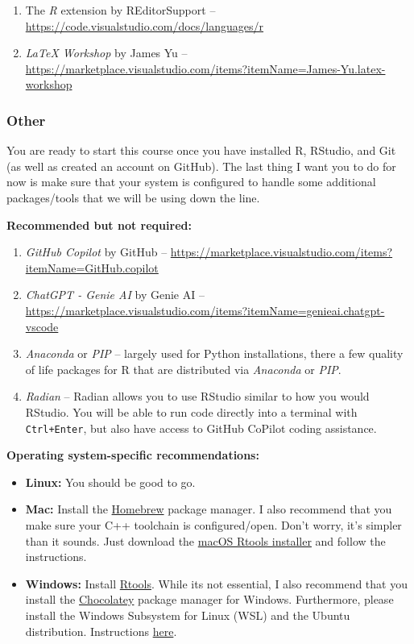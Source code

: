 \documentclass[11pt]{article}
\begin{document}
\begin{enumerate}
  \item The \textit{R} extension by REditorSupport -- \url{https://code.visualstudio.com/docs/languages/r}
  \item \textit{LaTeX Workshop} by James Yu -- \url{https://marketplace.visualstudio.com/items?itemName=James-Yu.latex-workshop}
\end{enumerate}

\vspace{-0.25cm}
\subsubsection*{Other}

You are ready to start this course once you have installed R, RStudio, and Git (as well as created an account on GitHub). The last thing I want you to do for now is make sure that your system is configured to handle some additional packages/tools that we will be using down the line. 

\textbf{Recommended but not required:}
\begin{enumerate}
  \item \textit{GitHub Copilot} by GitHub -- \url{https://marketplace.visualstudio.com/items?itemName=GitHub.copilot}
  \item \textit{ChatGPT - Genie AI} by Genie AI -- \url{https://marketplace.visualstudio.com/items?itemName=genieai.chatgpt-vscode}
  \item \textit{Anaconda} or \textit{PIP} -- largely used for Python installations, there a few quality of life packages for R that are distributed via \textit{Anaconda} or \textit{PIP}.
  \item \textit{Radian} -- Radian allows you to use RStudio similar to how you would RStudio. You will be able to run code directly into a terminal with \texttt{Ctrl+Enter}, but also have access to GitHub CoPilot coding assistance. 
\end{enumerate}

\textbf{Operating system-specific recommendations:}

\begin{itemize}
	\item \textbf{Linux:} You should be good to go. 
	\item \textbf{Mac:} Install the \href{https://brew.sh/}{Homebrew} package manager. I also recommend that you make sure your C++ toolchain is configured/open. Don't worry, it's simpler than it sounds. Just download the \href{https://github.com/rmacoslib/r-macos-rtools#installer-package-for-macos-r-toolchain-}{macOS Rtools installer} and follow the instructions.
	\item \textbf{Windows:} Install \href{https://cran.r-project.org/bin/windows/Rtools/}{Rtools}. While its not essential, I also recommend that you install the \href{https://chocolatey.org/}{Chocolatey} package manager for Windows. Furthermore, please install the Windows Subsystem for Linux (WSL) and the Ubuntu distribution. Instructions \href{https://docs.microsoft.com/en-us/windows/wsl/install-win10}{here}.
\end{itemize}
\end{document}
